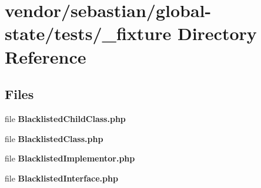 \section{vendor/sebastian/global-\/state/tests/\+\_\+fixture Directory Reference}
\label{dir_103aa2d20ae885c5e041bf3fca657e04}
\subsection*{Files}
\begin{DoxyCompactItemize}
\item 
file {\bf Blacklisted\+Child\+Class.\+php}
\item 
file {\bf Blacklisted\+Class.\+php}
\item 
file {\bf Blacklisted\+Implementor.\+php}
\item 
file {\bf Blacklisted\+Interface.\+php}
\end{DoxyCompactItemize}
